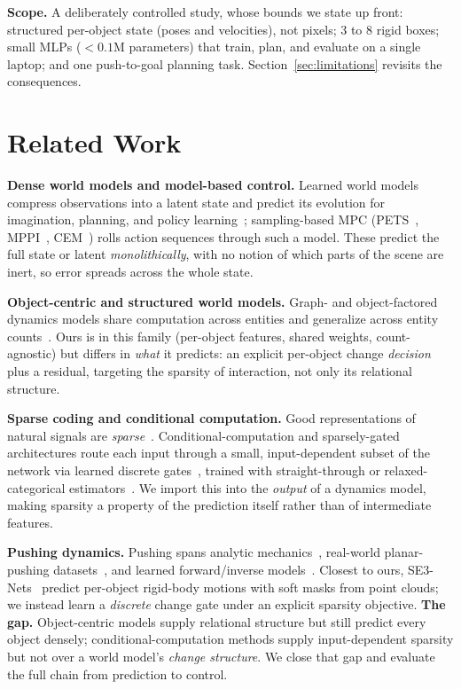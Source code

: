 \documentclass[conference]{IEEEtran}
\begin{document}
\textbf{Scope.} A deliberately controlled study, whose bounds we state up front:
structured per-object state (poses and velocities), not pixels; 3 to 8 rigid boxes; small
MLPs ($<0.1$M parameters) that train, plan, and evaluate on a single laptop; and one
push-to-goal planning task. Section~\ref{sec:limitations} revisits the consequences.

\section{Related Work}\label{sec:related}
\textbf{Dense world models and model-based control.} Learned world models compress
observations into a latent state and predict its evolution for imagination, planning,
and policy learning~\cite{ha2018world,hafner2020dream}; sampling-based MPC
(PETS~\cite{chua2018pets}, MPPI~\cite{williams2017mppi},
CEM~\cite{rubinstein1999cem}) rolls action sequences through such a model. These predict
the full state or latent \emph{monolithically}, with no notion of which parts of the
scene are inert, so error spreads across the whole state.

\textbf{Object-centric and structured world models.} Graph- and object-factored dynamics
models share computation across entities and generalize across entity
counts~\cite{battaglia2016interaction,sanchez2020gns,kipf2020cswm}. Ours is in this
family (per-object features, shared weights, count-agnostic) but differs in \emph{what}
it predicts: an explicit per-object change \emph{decision} plus a residual, targeting the
sparsity of interaction, not only its relational structure.

\textbf{Sparse coding and conditional computation.} Good representations of natural
signals are \emph{sparse}~\cite{olshausen1996sparse}. Conditional-computation and sparsely-gated
architectures route each input through a small, input-dependent subset of the network via
learned discrete gates~\cite{shazeer2017moe,bengio2013conditional}, trained with
straight-through or relaxed-categorical
estimators~\cite{jang2017gumbel,maddison2017concrete}. We import this into the
\emph{output} of a dynamics model, making sparsity a property of the prediction itself
rather than of intermediate features.

\textbf{Pushing dynamics.} Pushing spans analytic mechanics~\cite{mason1986pushing},
real-world planar-pushing datasets~\cite{yu2016push}, and learned forward/inverse
models~\cite{agrawal2016poke,finn2017foresight}. Closest to ours,
SE3-Nets~\cite{byravan2017se3nets} predict per-object rigid-body motions with soft masks
from point clouds; we instead learn a \emph{discrete} change gate under an explicit
sparsity objective. \textbf{The gap.} Object-centric models supply relational
structure but still predict every object densely; conditional-computation methods supply
input-dependent sparsity but not over a world model's \emph{change structure}. We close
that gap and evaluate the full chain from prediction to control.
\end{document}
